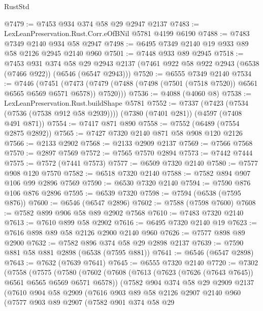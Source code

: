 \begin{lexlean}{RustStd}
\begin{coremodule}
@7479 := @7453 @934 @374 @58 @29 @2947 @2137
@7483 := LexLeanPreservation.Rust.Corr.eOfBNil @5781 @4199 @6190
@7488 := @7483 @7349 @2140 @934 @58 @2947
@7498 := @6495 @7349 @2140 @19 @933 @89 @58 @2126 @2945 @2140 @960
@7501 := @7448 @933 @89 @2945
@7518 := @7453
    @931
    @374
    @58
    @29
    @2943
    @2137
    (@7461 @922 @58 @922 @2943 (@6538 (@7466 @922)) (@6546 (@6547 @2943)))
@7520 := @6555 @7349 @2140
@7534 := @7446
    (@7451
      (@7473 (@7479 (@7488 (@7498 (@7501 (@7518 @7520)) @6561 @6565 @6569 @6571 @6578)) @7520)))
@7536 := @4088 (@4060 @8)
@7538 := LexLeanPreservation.Rust.buildShape @5781
@7552 := @7337
    (@7423 (@7534 (@7536 (@7538 @912 @58 @2939))))
    (@7380 (@7401 @281))
    (@4597 (@7408 @491 @871))
@7554 := @7417 @871 @890
@7558 := @7552 (@6489 (@7554 @2875 @2892))
@7565 := @7427 @7320 @2140 @871 @58 @908 @120 @2126
@7566 := @2133 @2902
@7568 := @2133 @2909 @2137
@7569 := @7566 @7568
@7570 := @2897 @7569
@7572 := @7565 @7570 @2894
@7573 := @7442 @7444
@7575 := @7572 (@7441 @7573)
@7577 := @6509 @7320 @2140
@7580 := @7577 @908 @120 @7570
@7582 := @6518 @7320 @2140
@7588 := @7582 @894 @907 @106 @99 @2896 @7569
@7590 := @6530 @7320 @2140
@7594 := @7590 @876 @106 @876 @2896
@7595 := @6539 @7320
@7598 := @7594 (@6538 (@7595 @876))
@7600 := @6546 (@6547 @2896)
@7602 := @7588 (@7598 @7600)
@7608 := @7582 @899 @906 @58 @89 @2902 @7568
@7610 := @7483 @7320 @2140
@7613 := @7610 @899 @58 @2902
@7616 := @6495 @7320 @2140 @19
@7623 := @7616 @898 @89 @58 @2126 @2900 @2140 @960
@7626 := @7577 @898 @89 @2900
@7632 := @7582 @896 @374 @58 @29 @2898 @2137
@7639 := @7590 @881 @58 @881 @2898 (@6538 (@7595 @881))
@7641 := @6546 (@6547 @2898)
@7643 := @7632 (@7639 @7641)
@7645 := @6555 @7320 @2140
@7720 := @7302
    (@7558
      (@7575
        (@7580
          (@7602
            (@7608
              (@7613 (@7623 (@7626 (@7643 @7645)) @6561 @6565 @6569 @6571 @6578))
              (@7582
                @904
                @374
                @58
                @29
                @2909
                @2137
                (@7610
                  @904
                  @58
                  @2909
                  (@7616
                    @903
                    @89
                    @58
                    @2126
                    @2907
                    @2140
                    @960
                    (@7577
                      @903
                      @89
                      @2907
                      (@7582
                        @901
                        @374
                        @58
                        @29

\end{coremodule}
\end{lexlean}

